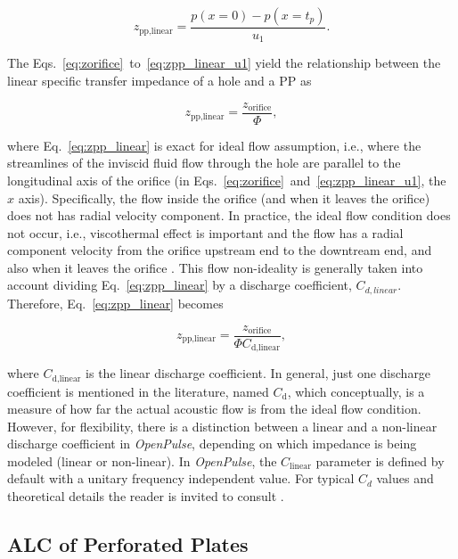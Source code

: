 \documentclass[12pt]{article}
\begin{document}
\begin{equation} \label{eq:zpp_linear_u1}
	z_{\text{pp,linear}} = \frac{p(x=0) - p(x=t_p)}{u_1}.
\end{equation}

\noindent The Eqs.~\ref{eq:zorifice}~to~\ref{eq:zpp_linear_u1} yield the relationship between the linear specific transfer impedance of a hole and a \acrshort{PP} as

\begin{equation} \label{eq:zpp_linear}
	z_{\text{pp,linear}} = \frac{z_{\text{orifice}}}{\Phi},
\end{equation}

\noindent where Eq.~\ref{eq:zpp_linear} is exact for ideal flow assumption, i.e., where the streamlines of the inviscid fluid flow through the hole are parallel to the longitudinal axis of the orifice (in Eqs.~\ref{eq:zorifice}~and~\ref{eq:zpp_linear_u1}, the $x$ axis). Specifically, the flow inside the orifice (and when it leaves the orifice) does not has radial velocity component. In practice, the ideal flow condition does not occur, i.e., viscothermal effect is important and the flow has a radial component velocity from the orifice upstream end to the downtream end, and also when it leaves the orifice \cite{MELLING19731}. This flow non-ideality is generally taken into account dividing Eq.~\ref{eq:zpp_linear} by a discharge coefficient, $C_{d,linear}$. Therefore, Eq.~\ref{eq:zpp_linear} becomes

\begin{equation} \label{eq:zpp_linear_nonideal}
	z_{\text{pp,linear}} = \frac{z_{\text{orifice}}}{\Phi C_{\text{d,linear}}},
\end{equation}

\noindent  where $C_{\text{d,linear}}$ is the linear discharge coefficient. In general, just one discharge coefficient is mentioned in the literature, named $C_{\text{d}}$, which conceptually, is a measure of how far the actual acoustic flow is from the ideal flow condition. However, for flexibility, there is a distinction between a linear and a non-linear discharge coefficient in \textit{OpenPulse}, depending on which impedance is being modeled (linear or non-linear). In \textit{OpenPulse}, the $C_\text{linear}$ parameter is defined by default with a unitary frequency independent value. For typical $C_d$ values and theoretical details the reader is invited to consult \cite{ MELLING19731,sun_pp,elnady_2003,zhou_pp}.

\subsection{\acrshort{ALC} of Perforated Plates} \label{subsec:alc_pp_chap3}
\end{document}
